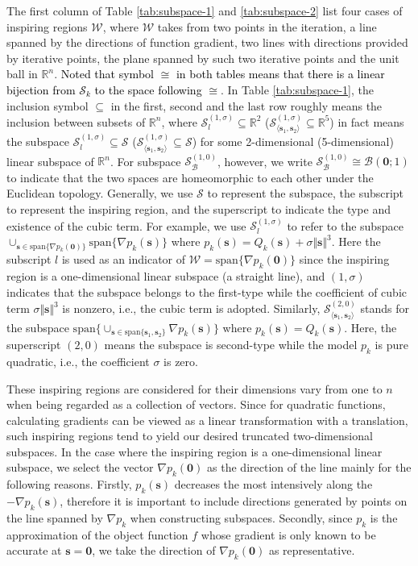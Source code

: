 \documentclass[colorlinks=true, linkcolor=blue, citecolor=blue, urlcolor=blue]{article}
\theoremstyle{plain}
\theoremstyle{definition}
\theoremstyle{remark}
\newcommand{\RR}{\mathbb{R}}
\begin{document}
The first column of Table \ref{tab:subspace-1} and \ref{tab:subspace-2} list four cases of inspiring regions $\mathcal{W}$, where $\mathcal{W}$ takes from two points in the iteration, a line spanned by the directions of function gradient, two lines with directions provided by iterative points, the plane spanned by such two iterative points and the unit ball in $\mathbb{R}^n$. \textcolor{black}{Noted that symbol $\cong$ in both tables means that there is a linear bijection from $\mathcal{S}_k$ to the space following $\cong$}. In Table \ref{tab:subspace-1}, the inclusion symbol $\subseteq$ in the first, second and the last row roughly means the inclusion between subsets of $\RR^n$, where $\mathcal{S}_l^{(1,\sigma)}\subseteq \mathbb{R}^2$ ($\mathcal{S}_{\langle \bm s_1,\bm s_2\rangle}^{(1,\sigma)}\subseteq\RR^5$) in fact means the subspace $\mathcal{S}_l^{(1,\sigma)}\subseteq \mathcal{S}$ ($\mathcal{S}_{\langle \bm s_1,\bm s_2\rangle}^{(1,\sigma)}\subseteq\mathcal{S}$) for some 2-dimensional (5-dimensional) linear subspace of $\RR^n$. For subspace $\mathcal{S}_{\mathcal{B}}^{(1,0)}$, however, we write $\mathcal{S}_{\mathcal{B}}^{(1,0)}\cong \mathcal{B}(\bm 0;1)$ to indicate that the two spaces are homeomorphic to each other under the Euclidean topology. Generally, we use $\mathcal{S}$ to represent the subspace, the subscript to represent the inspiring region, and the superscript to indicate the type and existence of the cubic term. For example, we use $\mathcal{S}_l^{(1,\sigma)}$ to refer to the subspace $\cup_{\bm s\in\mathrm{span}\{\nabla p_k(\bm 0)\}}\mathrm{span}\{\nabla p_k(\bm s)\}$ where $p_k(\bm s)=Q_k(\bm s)+\sigma\Vert \bm s\Vert ^3$. Here the subscript $l$ is used as an indicator of $\mathcal{W}=\mathrm{span}\{\nabla p_k(\bm 0)\}$ since the inspiring region is a one-dimensional linear subspace (a straight line), and $(1,\sigma)$ indicates that the subspace belongs to the first-type while the coefficient of cubic term $\sigma\Vert\bm s\Vert^3$ is nonzero, i.e., the cubic term is adopted. Similarly, $\mathcal{S}_{\langle\bm s_1,\bm s_2\rangle}^{(2,0)}$ stands for the subspace $\mathrm{span}\{\cup_{\bm s\in\mathrm{span}\{\bm s_1,\bm s_2\}}\nabla p_k(\bm s)\}$ where $p_k(\bm s)=Q_k(\bm s)$. Here, the superscript $(2,0)$ means the subspace is second-type while the model $p_k$ is pure quadratic, i.e., the coefficient $\sigma$ is zero.

These inspiring regions are considered for their dimensions vary from one to $n$ when being regarded as a collection of vectors. Since for quadratic functions, calculating gradients can be viewed as a linear transformation with a translation, such inspiring regions tend to yield our desired truncated two-dimensional subspaces.
In the case where the inspiring region is a one-dimensional linear subspace, we select the vector $\nabla p_k(\bm 0)$ as the direction of the line mainly for the following reasons. Firstly, $p_k(\bm s)$ decreases the most intensively along the $-\nabla p_k(\bm s)$, therefore it is important to include directions generated by points on the line spanned by $\nabla p_k$ when constructing subspaces. Secondly, since $p_k$ is the approximation of the object function $f$ whose gradient is only known to be accurate at $\bm s=\bm 0$, we take the direction of $\nabla p_k(\bm 0)$ as representative. 
\end{document}
